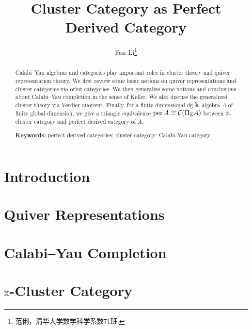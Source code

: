 \documentclass[twoside]{article}
\begin{document}
\title{Cluster Category as Perfect Derived Category}
\author{Fan Li\footnote{范俐，清华大学数学科学系数71班.}}
\begin{abstract}
  Calabi--Yau algebras and categories play important roles in cluster theory
  and quiver representation theory.
  We first review some basic notions on
  quiver representations and cluster categories via orbit categories.
  We then generalize some notions and conclusions about Calabi--Yau completion
  in the sense of Keller.
  We also discuss the generalized cluster theory via Verdier quotient.
  Finally, for a finite-dimensional dg $\mathbf{k}$-algebra $A$ of finite global dimension,
  we give a triangle equivalence $\operatorname{per} A \cong \operatorname{\mathcal{C}}(\Pi_{\mathbb{X}}A)$ between
  $\mathbb{X}$-cluster category and perfect derived category of $A$.

  \bigskip
  \noindent
  \textbf{Keywords:}
  perfect derived categories; cluster category; Calabi-Yau category
\end{abstract}

\tableofcontents

\section{Introduction}


\section{Quiver Representations}


\section{Calabi--Yau Completion}


\section{\texorpdfstring{$\mathbb{X}$}{X}-Cluster Category}


\printbibliography
\end{document}
